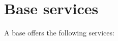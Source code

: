 \documentclass[a4paper,12pt,notitlepage,twocolumn]{article}
\begin{document}
%

\section{Base services}

A base offers the following services:
\end{document}

